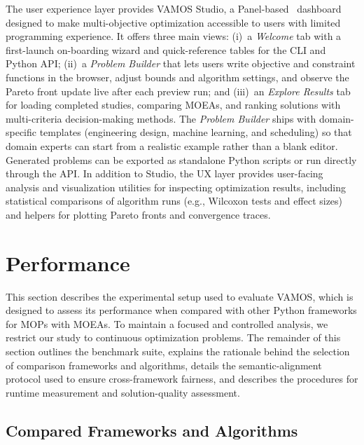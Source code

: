 \documentclass[journal]{IEEEtran}
\newcommand{\VAMOS}{VAMOS}
\begin{document}
The user experience layer provides \VAMOS{} Studio, a Panel-based~\cite{panel24} dashboard designed to make multi-objective optimization accessible to users with limited programming experience. It offers three main views: (i)~a \textit{Welcome} tab with a first-launch on-boarding wizard and quick-reference tables for the CLI and Python API; (ii)~a \textit{Problem Builder} that lets users write objective and constraint functions in the browser, adjust bounds and algorithm settings, and observe the Pareto front update live after each preview run; and (iii)~an \textit{Explore Results} tab for loading completed studies, comparing MOEAs, and ranking solutions with multi-criteria decision-making methods. The \textit{Problem Builder} ships with domain-specific templates (engineering design, machine learning, and scheduling) so that domain experts can start from a realistic example rather than a blank editor. Generated problems can be exported as standalone Python scripts or run directly through the API. In addition to Studio, the UX layer provides user-facing analysis and visualization utilities for inspecting optimization results, including statistical comparisons of algorithm runs (e.g., Wilcoxon tests and effect sizes) and helpers for plotting Pareto fronts and convergence traces.



\section{Performance}
\label{sec:performance}

This section describes the experimental setup used to evaluate \VAMOS{}, which is designed to assess its performance when compared with other Python frameworks for MOPs with MOEAs. To maintain a focused and controlled analysis, we restrict our study to continuous optimization problems. The remainder of this section outlines the benchmark suite, explains the rationale behind the selection of comparison frameworks and algorithms, details the semantic-alignment protocol used to ensure cross-framework fairness, and describes the procedures for runtime measurement and solution-quality assessment.

\subsection{Compared Frameworks and Algorithms}
\end{document}
